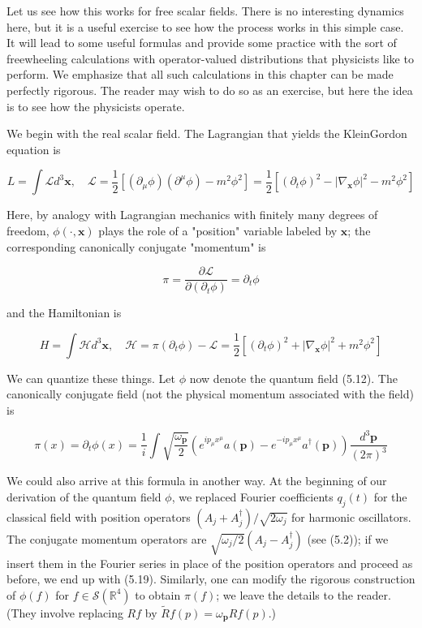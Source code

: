 \documentclass[10pt, letterpaper]{article}
\begin{document}
Let us see how this works for free scalar fields. There is no interesting dynamics here, but it is a useful exercise to see how the process works in this simple case. It will lead to some useful formulas and provide some practice with the sort of freewheeling calculations with operator-valued distributions that physicists like to perform. We emphasize that all such calculations in this chapter can be made perfectly rigorous. The reader may wish to do so as an exercise, but here the idea is to see how the physicists operate.

We begin with the real scalar field. The Lagrangian that yields the KleinGordon equation is

$$
L=\int \mathcal{L} d^{3} \mathbf{x}, \quad \mathcal{L}=\frac{1}{2}\left[\left(\partial_{\mu} \phi\right)\left(\partial^{\mu} \phi\right)-m^{2} \phi^{2}\right]=\frac{1}{2}\left[\left(\partial_{t} \phi\right)^{2}-\left|\nabla_{\mathbf{x}} \phi\right|^{2}-m^{2} \phi^{2}\right]
$$

Here, by analogy with Lagrangian mechanics with finitely many degrees of freedom, $\phi(\cdot, \mathbf{x})$ plays the role of a "position" variable labeled by $\mathbf{x}$; the corresponding canonically conjugate "momentum" is

$$
\pi=\frac{\partial \mathcal{L}}{\partial\left(\partial_{t} \phi\right)}=\partial_{t} \phi
$$

and the Hamiltonian is

$$
H=\int \mathcal{H} d^{3} \mathbf{x}, \quad \mathcal{H}=\pi\left(\partial_{t} \phi\right)-\mathcal{L}=\frac{1}{2}\left[\left(\partial_{t} \phi\right)^{2}+\left|\nabla_{\mathbf{x}} \phi\right|^{2}+m^{2} \phi^{2}\right]
$$

We can quantize these things. Let $\phi$ now denote the quantum field (5.12). The canonically conjugate field (not the physical momentum associated with the field) is

$$
\pi(x)=\partial_{t} \phi(x)=\frac{1}{i} \int \sqrt{\frac{\omega_{\mathbf{p}}}{2}}\left(e^{i p_{\mu} x^{\mu}} a(\mathbf{p})-e^{-i p_{\mu} x^{\mu}} a^{\dagger}(\mathbf{p})\right) \frac{d^{3} \mathbf{p}}{(2 \pi)^{3}}
$$

We could also arrive at this formula in another way. At the beginning of our derivation of the quantum field $\phi$, we replaced Fourier coefficients $q_{j}(t)$ for the classical field with position operators $\left(A_{j}+A_{j}^{\dagger}\right) / \sqrt{2 \omega_{j}}$ for harmonic oscillators. The conjugate momentum operators are $\sqrt{\omega_{j} / 2}\left(A_{j}-A_{j}^{\dagger}\right)$ (see (5.2)); if we insert them in the Fourier series in place of the position operators and proceed as before, we end up with (5.19). Similarly, one can modify the rigorous construction of $\phi(f)$ for $f \in \mathcal{S}\left(\mathbb{R}^{4}\right)$ to obtain $\pi(f)$; we leave the details to the reader. (They involve replacing $R f$ by $\widetilde{R} f(p)=\omega_{\mathbf{p}} R f(p)$.)
\end{document}
